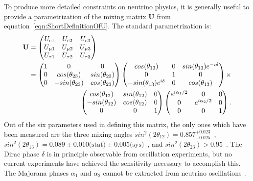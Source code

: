 To produce more detailed constraints on neutrino physics, it is generally useful to provide a parametrization of the mixing matrix $\mathbf{U}$ from equation~\ref{eqn:ShortDefinitionOfU}.  The standard parametrization is:
\begin{align} \label{eqn:LongDefinitionOfU}
  \mathbf{U} &=
    \begin{pmatrix}
    U_{e1} & U_{e2} & U_{e3} \\
    U_{\mu1} & U_{\mu2} & U_{\mu3} \\
    U_{\tau1} & U_{\tau2} & U_{\tau3}
    \end{pmatrix} \notag \\
  &= \begin{aligned}[t]
      \begin{pmatrix}
      1 & 0 & 0 \\
      0 & cos(\theta_{23}) & sin(\theta_{23}) \\
      0 & -sin(\theta_{23}) & cos(\theta_{23})
      \end{pmatrix}
      \begin{pmatrix}
      cos(\theta_{13}) & 0 & sin(\theta_{13})e^{-i\delta} \\
      0 & 1 & 0 \\
      -sin(\theta_{13})e^{i\delta} & 0 & cos(\theta_{13})
      \end{pmatrix} \times \\
      \begin{pmatrix}
      cos(\theta_{12}) & sin(\theta_{12}) & 0 \\
      -sin(\theta_{12}) & cos(\theta_{12}) & 0 \\
      0 & 0 & 1
      \end{pmatrix}
      \begin{pmatrix}
      e^{i\alpha_1/2} & 0 & 0 \\
      0 & e^{i\alpha_2/2} & 0 \\
      0 & 0 & 1
      \end{pmatrix}.
    \end{aligned}
\end{align}
Out of the six parameters used in defining this matrix, the only ones which have been measured are the three mixing angles $sin^2(2\theta_{12}) = 0.857^{+0.023}_{-0.025}$~\cite{PhysRevD.83.052002}, $sin^2(2\theta_{13}) = 0.089 \pm 0.010 \text{(stat)} \pm 0.005\text{(sys)}$~\cite{1674-1137-37-1-011001}, and $sin^2(2\theta_{23}) > 0.95$~\cite{PhysRevLett.107.241801}.  The Dirac phase $\delta$ is in principle observable from oscillation experiments, but no current experiments have achieved the sensitivity necessary to accomplish this.  The Majorana phases $\alpha_1$ and $\alpha_2$ cannot be extracted from neutrino oscillations~\cite{RMPbb0n}.

